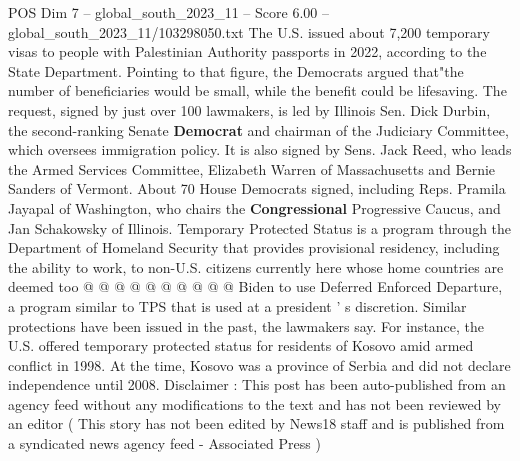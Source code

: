 \begin{textsample}{POS Dim 7 – global\_south\_2023\_11 – Score 6.00 – global\_south\_2023\_11/103298050.txt}
The U.S. issued about 7,200 temporary visas to people with Palestinian Authority passports in 2022, according to the State Department.
Pointing to that figure, the Democrats argued that"the number of beneficiaries would be small, while the benefit could be lifesaving.
The request, signed by just over 100 lawmakers, is led by Illinois Sen.
Dick Durbin, the second-ranking Senate \textbf{Democrat} and chairman of the Judiciary Committee, which oversees immigration policy.
It is also signed by Sens.
Jack Reed, who leads the Armed Services Committee, Elizabeth Warren of Massachusetts and Bernie Sanders of Vermont.
About 70 House Democrats signed, including Reps.
Pramila Jayapal of Washington, who chairs the \textbf{Congressional} Progressive Caucus, and Jan Schakowsky of Illinois.
Temporary Protected Status is a program through the Department of Homeland Security that provides provisional residency, including the ability to work, to non-U.S. citizens currently here whose home countries are deemed too @ @ @ @ @ @ @ @ @ @ Biden to use Deferred Enforced Departure, a program similar to TPS that is used at a president ' s discretion.
Similar protections have been issued in the past, the lawmakers say.
For instance, the U.S. offered temporary protected status for residents of Kosovo amid armed conflict in 1998.
At the time, Kosovo was a province of Serbia and did not declare independence until 2008.
Disclaimer : This post has been auto-published from an agency feed without any modifications to the text and has not been reviewed by an editor ( This story has not been edited by News18 staff and is published from a syndicated news agency feed - Associated Press )

\end{textsample}

